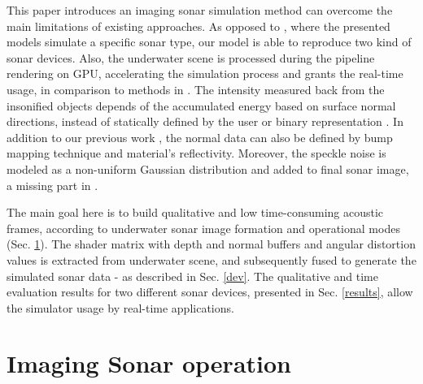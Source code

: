 \documentclass[final,5p,times]{elsarticle}
\begin{document}
This paper introduces an imaging sonar simulation method can overcome 
the main limitations of existing approaches. As opposed to \cite{bell1997,coiras2009,gueriot2010,sac2015,demarco2015,gu2013,kwak2015}, where 
the presented models simulate a specific sonar type, our model is able to 
reproduce two kind of sonar devices. Also, the underwater scene is 
processed during the pipeline rendering on GPU, accelerating the 
simulation process and grants the real-time usage, in comparison to 
methods in \cite{bell1997,coiras2009,sac2015,demarco2015}. The intensity measured back from the insonified objects depends of the accumulated energy based on surface normal directions, instead of statically defined by the user \cite{demarco2015} or binary representation \cite{gu2013, kwak2015}. In addition to our previous work \cite{cerqueira2016}, the normal data can also be defined by bump mapping technique and material's reflectivity. Moreover, the speckle noise is modeled as a non-uniform Gaussian distribution and added to final sonar image, a missing part in \cite{gueriot2010,gu2013,kwak2015,sac2015}.

The main goal here is to build qualitative and low time-consuming acoustic frames, according to underwater sonar image formation and operational modes (Sec. \ref{sonar:operation}). The shader matrix with depth and normal buffers and angular distortion values is extracted from underwater scene, and subsequently fused to generate the simulated sonar data - as described in Sec. \ref{dev}. The qualitative and time evaluation results for two different sonar devices, presented in Sec. \ref{results}, allow the simulator usage by real-time applications.


\section{Imaging Sonar operation}
\label{sonar:operation}

\end{document}
